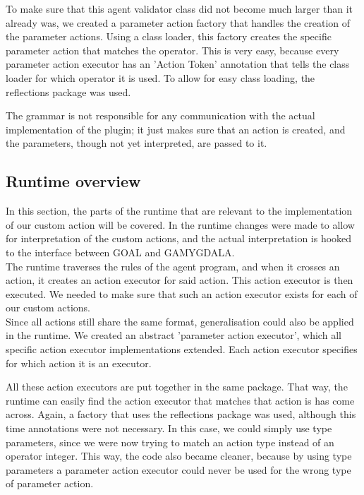 To make sure that this agent validator class did not become much larger than it already was, we created a parameter action factory that handles the creation of the parameter actions. Using a class loader, this factory creates the specific parameter action that matches the operator. This is very easy, because every parameter action executor has an 'Action Token' annotation that tells the class loader for which operator it is used. To allow for easy class loading, the reflections package was used.

The grammar is not responsible for any communication with the actual implementation of the plugin; it just makes sure that an action is created, and the parameters, though not yet interpreted, are passed to it.

\subsection{Runtime overview}
In this section, the parts of the runtime that are relevant to the implementation of our custom action will be covered. In the runtime changes were made to allow for interpretation of the custom actions, and the actual interpretation is hooked to the interface between GOAL and GAMYGDALA. \\ 

The runtime traverses the rules of the agent program, and when it crosses an action, it creates an action executor for said action. This action executor is then executed. We needed to make sure that such an action executor exists for each of our custom actions. \\

Since all actions still share the same format, generalisation could also be applied  in the runtime. We created an abstract 'parameter action executor', which all specific action executor implementations extended. Each action executor specifies for which action it is an executor.

All these action executors are put together in the same package. That way, the runtime can easily find the action executor that matches that action is has come across. Again, a factory that uses the reflections package was used, although this time annotations were not necessary. In this case, we could simply use type parameters, since we were now trying to match an action type instead of an operator integer. This way, the code also became cleaner, because by using type parameters a parameter action executor could never be used for the wrong type of parameter action.

